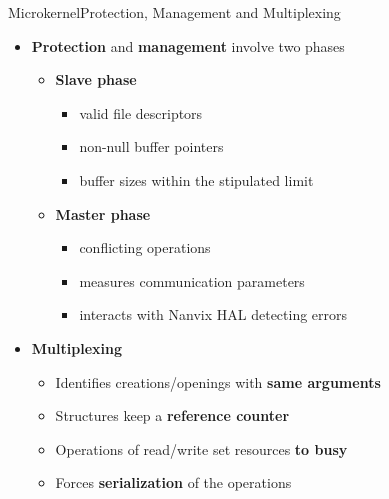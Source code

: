 		\begin{frame}[fragile]{Microkernel}{Protection, Management and Multiplexing}
			\begin{itemize}
				\item \textbf{Protection} and \textbf{management} involve two phases
				\begin{itemize}
					\item \textbf{Slave phase}
					\begin{itemize}
						\item valid file descriptors
						\item non-null buffer pointers
						\item buffer sizes within the stipulated limit
					\end{itemize}
					\item \textbf{Master phase}
					\begin{itemize}
						\item conflicting operations
						\item measures communication parameters
						\item interacts with Nanvix HAL detecting errors
					\end{itemize}
				\end{itemize}
			\end{itemize}

			\begin{itemize}
				\item \textbf{Multiplexing}
				\begin{itemize}
					\item Identifies creations/openings with \textbf{same arguments}
					\item Structures keep a \textbf{reference counter}
					\item Operations of read/write set resources \textbf{to busy}
					\item Forces \textbf{serialization} of the operations
				\end{itemize}
			\end{itemize}

		\end{frame}

